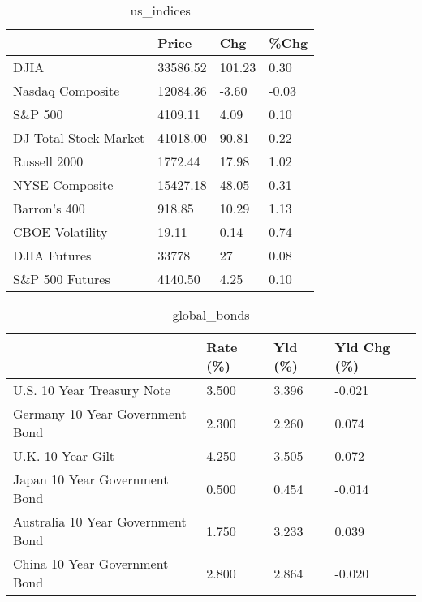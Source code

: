 \documentclass{article}%
\begin{document}
%


\begin{table}[htbp]%
\caption{us\_indices}%
\centering%
\begin{adjustbox}{width=1\textwidth}%
\begin{tabular}{llll}
\toprule
                      &    Price &    Chg &  \%Chg \\
\midrule
                 DJIA & 33586.52 & 101.23 &  0.30 \\
     Nasdaq Composite & 12084.36 &  -3.60 & -0.03 \\
              S\&P 500 &  4109.11 &   4.09 &  0.10 \\
DJ Total Stock Market & 41018.00 &  90.81 &  0.22 \\
         Russell 2000 &  1772.44 &  17.98 &  1.02 \\
       NYSE Composite & 15427.18 &  48.05 &  0.31 \\
         Barron's 400 &   918.85 &  10.29 &  1.13 \\
      CBOE Volatility &    19.11 &   0.14 &  0.74 \\
         DJIA Futures &    33778 &     27 &  0.08 \\
      S\&P 500 Futures &  4140.50 &   4.25 &  0.10 \\
\bottomrule
\end{tabular}
%
\end{adjustbox}%
\end{table}

%


\begin{table}[htbp]%
\caption{global\_bonds}%
\centering%
\begin{adjustbox}{width=1\textwidth}%
\begin{tabular}{llll}
\toprule
                                  & Rate (\%) & Yld (\%) & Yld Chg (\%) \\
\midrule
       U.S. 10 Year Treasury Note &    3.500 &   3.396 &      -0.021 \\
  Germany 10 Year Government Bond &    2.300 &   2.260 &       0.074 \\
                U.K. 10 Year Gilt &    4.250 &   3.505 &       0.072 \\
    Japan 10 Year Government Bond &    0.500 &   0.454 &      -0.014 \\
Australia 10 Year Government Bond &    1.750 &   3.233 &       0.039 \\
    China 10 Year Government Bond &    2.800 &   2.864 &      -0.020 \\
\bottomrule
\end{tabular}
%
\end{adjustbox}%
\end{table}
\end{document}
